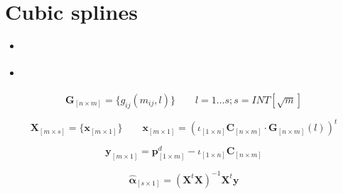 \section{Cubic splines}
\label{sec:cubic-splines}

\begin{itemize}
\item \cite{McCulloch1971, McCulloch1975}
\item \cite{}
\end{itemize}


	$$\bm{G}_{\left[n \times m\right]} = \{  g_{ij}(m_{ij},l) \} \qquad   l = 1\dots s ; s= INT[\sqrt{m}]$$

	

	$$\bm{X}_{\left[m \times s\right]}=\{ \bm{x}_{\left[m \times 1\right]} \} \qquad  \bm{x}_{\left[m \times 1\right]} = \left( \iota_{\left[1\times n\right]} \bm{C}_{\left[n\times m\right]} \cdot \bm{G}_{\left[n\times m\right]}(l) \right)^t$$

	

	$$\bm{y}_{\left[m \times 1\right]}=  \bm{p}^d_{\left[1\times m\right]}  - \iota_{\left[1\times n\right]} \bm{C}_{\left[n\times m\right]}   $$

	

	$$\bm{\hat \alpha}_{\left[s \times 1\right]}= \left( \bm{X}^t   \bm{X}\right )^{-1}\bm{X}^t \bm{y}$$



